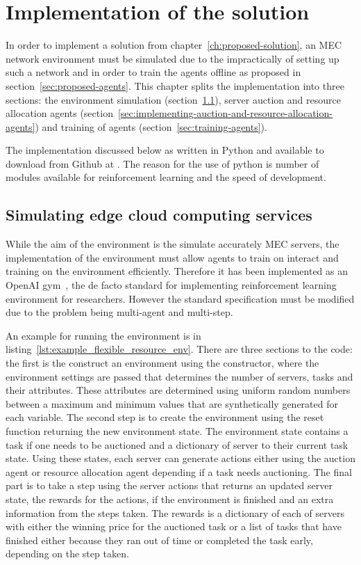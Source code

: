 \lstset{aboveskip=10pt}
\chapter{Implementation of the solution}\label{ch:implementation-of-the-solution}
In order to implement a solution from chapter~\ref{ch:proposed-solution}, an MEC network environment
must be simulated due to the impractically of setting up such a network and in order to train the agents offline as
proposed in section~\ref{sec:proposed-agents}. This chapter splits the implementation into three sections: the
environment simulation (section~\ref{sec:simulating-edge-cloud-computing-services}), server auction and resource
allocation agents (section~\ref{sec:implementing-auction-and-resource-allocation-agents}) and training of agents
(section~\ref{sec:training-agents}).

The implementation discussed below as written in Python and available to download from Github at
. The reason for the use of python is
number of modules available for reinforcement learning and the speed of development.

\section{Simulating edge cloud computing services}\label{sec:simulating-edge-cloud-computing-services}
While the aim of the environment is the simulate accurately MEC servers, the implementation of the environment must
allow agents to train on interact and training on the environment efficiently. Therefore it has been implemented
as an OpenAI gym~\citep{openaigym}, the de facto standard for implementing reinforcement learning environment for
researchers. However the standard specification must be modified due to the problem being multi-agent and multi-step.

An example for running the environment is in listing~\ref{lst:example_flexible_resource_env}. There are three
sections to the code: the first is the construct an environment using the constructor, where the environment settings
are passed that determines the number of servers, tasks and their attributes. These attributes are determined using
uniform random numbers between a maximum and minimum values that are synthetically generated for each variable. The
second step is to create the environment using the reset function returning the new environment state. The environment
state contains a task if one needs to be auctioned and a dictionary of server to their current task state. Using these
states, each server can generate actions either using the auction agent or resource allocation agent depending if a task
needs auctioning. The final part is to take a step using the server actions that returns an updated server state, the
rewards for the actions, if the environment is finished and an extra information from the steps taken. The rewards is a
dictionary of each of servers with either the winning price for the auctioned task or a list of tasks that have
finished either because they ran out of time or completed the task early, depending on the step taken.


